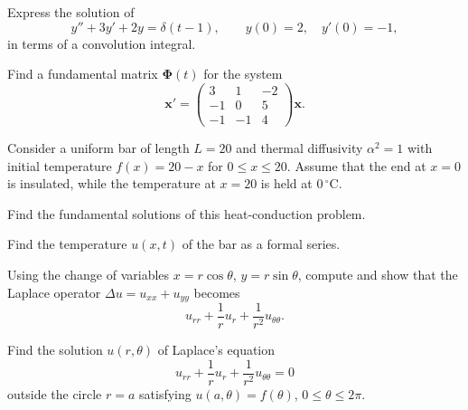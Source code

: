 \documentclass[11pt,oneside]{article}
\begin{document}
\begin{problem}
Express the solution of
\[y''+3y'+2y=\delta(t-1),\qquad y(0)=2,\quad y'(0)=-1,\]
in terms of a convolution integral.
\end{problem}

\begin{problem}
Find a fundamental matrix $\boldsymbol\Phi(t)$ for the system
\[\mathbf x'=\begin{pmatrix}3&1&-2\\-1&0&5\\-1&-1&4\end{pmatrix}\mathbf x.\]
\end{problem}

\begin{problem}
Consider a uniform bar of length $L=20$ and thermal diffusivity $\alpha^2=1$ with initial temperature $f(x)=20-x$ for $0\le x\le20$. Assume that the end at $x=0$ is insulated, while the temperature at $x=20$ is held at $0\,{}^\circ\mathrm C$.
\begin{problemsubparts}
\item Find the fundamental solutions of this heat-conduction problem.
\item Find the temperature $u(x,t)$ of the bar as a formal series.
\end{problemsubparts}
\end{problem}

\begin{problem}
\begin{problemsubparts}
\item Using the change of variables $x=r\cos\theta$, $y=r\sin\theta$, compute and show that the Laplace operator $\Delta u=u_{xx}+u_{yy}$ becomes
\[u_{rr}+\frac1r u_r+\frac1{r^2}u_{\theta\theta}.\]
\item Find the solution $u(r,\theta)$ of Laplace's equation
\[u_{rr}+\frac1r u_r+\frac1{r^2}u_{\theta\theta}=0\]
outside the circle $r=a$ satisfying $u(a,\theta)=f(\theta)$, $0\le\theta\le2\pi$.
\end{problemsubparts}
\end{problem}
\end{document}
